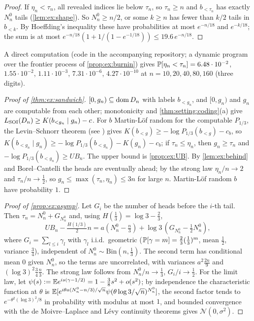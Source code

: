 \begin{proof}
If $\eta_n<\tau_n$, all revealed indices lie below $\tau_n$, so $\tau_n\ge n$ and $b_{<\tau_n}$ has exactly $N^0_n$ tails (\cref{lem:ex:shape}). So $N^0_n\ge n/2$, or some $k\ge n$ has fewer than $k/2$ tails in $b_{<k}$. By Hoeffding's inequality \citep{hoeffding1963probability} these have probabilities at most $e^{-n/18}$ and $e^{-k/18}$; the sum is at most $e^{-n/18}(1+1/(1-e^{-1/18}))\le19.6\,e^{-n/18}$.
\end{proof}
A direct computation (code in the accompanying repository; a dynamic program over the frontier process of \cref{prop:ex:burnin}) gives $\mathbb{P}[\eta_n<\tau_n]=6.48\cdot10^{-2}$, $1.55\cdot10^{-2}$, $1.11\cdot10^{-3}$, $7.31\cdot10^{-6}$, $4.27\cdot10^{-10}$ at $n=10,20,40,80,160$ (three digits).

\begin{proof}[Proof of \cref{thm:ex:sandwich}]
$[0,g_n)\subseteq\operatorname{dom} D_n$ with labels $b_{<g_n}$, and $[0,g_n)$ and $g_n$ are computable from each other; monotonicity and \cref{thm:setting:coding}(a) give $L_{\mathrm{SOI}}(D_n)\ge K(b_{<g_n}\mid g_n)-c$. For $b$ Martin-L\"of random for the computable $P_{1/3}$, the Levin--Schnorr theorem (see \citealp{li2008introduction}) gives $K(b_{<g})\ge-\log P_{1/3}(b_{<g})-c_b$, so $K(b_{<g_n}\mid g_n)\ge-\log P_{1/3}(b_{<g_n})-K(g_n)-c_b$; if $\tau_n\le\eta_n$, then $g_n\ge\tau_n$ and $-\log P_{1/3}(b_{<g_n})\ge UB_n$. The upper bound is \cref{prop:ex:UB}. By \cref{lem:ex:behind} and Borel--Cantelli the heads are eventually ahead; by the strong law $\eta_n/n\to2$ and $\tau_n/n\to\frac12$, so $g_n\le\max(\tau_n,\eta_n)\le3n$ for large $n$. Martin-L\"of random $b$ have probability $1$.
\end{proof}

\begin{proof}[Proof of \cref{prop:ex:asymp}]
Let $G_i$ be the number of heads before the $i$-th tail. Then $\tau_n=N^0_n+G_{N^0_n}$ and, using $H(\frac13)=\log3-\frac23$,
\[UB_n-\tfrac{H(1/3)}2n=a(N^0_n-\tfrac n3)+\log3\,(G_{N^0_n}-\tfrac12N^0_n),\]
where $G_i=\sum_{l\le i}\gamma_l$ with $\gamma_l$ i.i.d.\ geometric ($\mathbb{P}[\gamma=m]=\frac23(\frac13)^m$, mean $\frac12$, variance $\frac34$), independent of $N^0_n\sim\mathrm{Bin}(n,\frac13)$. The second term has conditional mean $0$ given $N^0_n$, so the terms are uncorrelated, with variances $a^2\frac{2n}9$ and $(\log3)^2\frac34\frac n3$. The strong law follows from $N^0_n/n\to\frac13$, $G_i/i\to\frac12$. For the limit law, let $\psi(s):=\mathbb{E} e^{is(\gamma-1/2)}=1-\frac38s^2+o(s^2)$; by independence the characteristic function at $\theta$ is $\mathbb{E}[e^{i\theta a(N^0_n-n/3)/\sqrt n}\psi(\theta\log3/\sqrt n)^{N^0_n}]$, the second factor tends to $e^{-\theta^2(\log3)^2/8}$ in probability with modulus at most $1$, and bounded convergence with the de Moivre--Laplace and L\'evy continuity theorems gives $\mathcal N(0,\sigma^2)$.
\end{proof}

